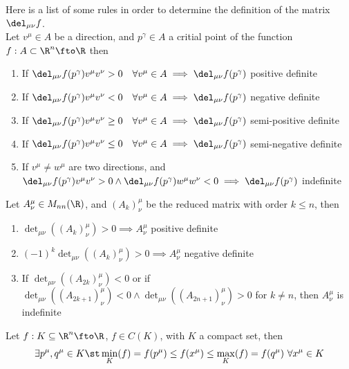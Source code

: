 \documentclass[../mmf.tex]{subfiles}
\begin{document}
\begin{thm}
	Here is a list of some rules in order to determine the definition of the matrix $\del_{\mu\nu}f$.\\
	Let $v^\mu\in A$ be a direction, and $p^\gamma\in A$ a critial point of the function $f:A\subset\R^n\fto\R$ then
	\begin{enumerate}
	\item If $\del_{\mu\nu}f(p^\gamma)v^\mu v^\nu>0\quad\forall v^\mu\in A\implies{}\del_{\mu\nu}f(p^\gamma)$ positive definite
	\item If $\del_{\mu\nu}f(p^\gamma)v^\mu v^\nu<0\quad\forall v^\mu\in A\implies{}\del_{\mu\nu}f(p^\gamma)$ negative definite
	\item If $\del_{\mu\nu}f(p^\gamma)v^\mu v^\nu\ge0\quad\forall v^\mu\in A\implies{}\del_{\mu\nu}f(p^\gamma)$ semi-positive definite
	\item If $\del_{\mu\nu}f(p^\gamma)v^\mu v^\nu\le0\quad\forall v^\mu\in A\implies{}\del_{\mu\nu}f(p^\gamma)$ semi-negative definite
	\item If $v^\mu\ne w^\mu$ are two directions, and $\del_{\mu\nu}f(p^\gamma)v^\mu v^\nu>0\wedge\del_{\mu\nu}f(p^\gamma)w^\mu w^\nu<0\implies{}\del_{\mu\nu}f(p^\gamma)$ indefinite
	\end{enumerate}
\end{thm}
\begin{thm}
	Let $A^\mu_\nu\in M_{nn}(\R)$, and $(A_k)^\mu_\nu$ be the reduced matrix with order $k\le n$, then
	\begin{enumerate}
	\item $\det_{\mu\nu}\left( (A_k)^\mu_\nu \right)>0\implies{} A^\mu_\nu$ positive definite
	\item $(-1)^k\det_{\mu\nu}\left( (A_k)^\mu_\nu \right)>0\implies{} A^\mu_\nu$ negative definite
	\item If $\det_{\mu\nu}\left( (A_{2k})^\mu_\nu \right)<0$ or if $\det_{\mu\nu}\left( (A_{2k+1})^\mu_\nu \right)<0\wedge\det_{\mu\nu}\left( (A_{2n+1})^\mu_\nu \right)>0$ for $k\ne n$, then $A^\mu_\nu$ is indefinite
	\end{enumerate}
\end{thm}
\begin{thm}
	Let $f:K\subseteq\R^n\fto\R$, $f\in C(K)$, with $K$ a compact set, then
	\begin{equation}
		\exists p^\mu,q^\mu\in K\st\min_K(f)=f(p^\mu)\le f(x^\mu)\le\max_K(f)=f(q^\mu)\ \forall x^\mu\in K
		\label{eq:weierstrass}
	\end{equation}
\end{thm}
\end{document}
